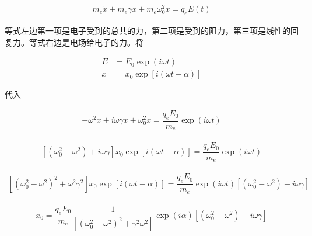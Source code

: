 \documentclass{article}
\begin{document}
\begin{equation*}
  \begin{aligned}
    m_e \ddot{x} + m_e \gamma \dot{x} + m_e \omega_0^2 x = q_e E \left( t \right)
  \end{aligned}
\end{equation*}

等式左边第一项是电子受到的总共的力，第二项是受到的阻力，第三项是线性的回复力。等式右边是电场给电子的力。将

\begin{equation*}
  \begin{aligned}
    E &= E_0 \exp \left( i \omega t \right) \\
    x &= x_0 \exp \left[ i \left( \omega t - \alpha \right) \right]
  \end{aligned}
\end{equation*}

代入

\begin{equation*}
  \begin{aligned}
    - \omega^2 x + i \omega \gamma x + \omega_0^2 x = \dfrac{q_e E_0}{m_e} \exp \left( i \omega t \right) 
  \end{aligned}
\end{equation*}

\begin{equation*}
  \begin{aligned}
    \left[ \left( \omega_0^2 - \omega^2 \right)  + i \omega \gamma \right] x_0 \exp \left[ i \left( \omega t - \alpha \right) \right] = \dfrac{q_e E_0}{m_e} \exp \left( i \omega t \right) 
  \end{aligned}
\end{equation*}

\begin{equation*}
  \begin{aligned}
    \left[ \left( \omega_0^2 - \omega^2 \right)^2  + \omega^2 \gamma^2 \right] x_0 \exp \left[ i \left( \omega t - \alpha \right) \right] = \dfrac{q_e E_0}{m_e} \exp \left( i \omega t \right) \left[ \left( \omega_0^2 - \omega^2 \right) - i \omega \gamma \right]
  \end{aligned}
\end{equation*}

\begin{equation*}
  \begin{aligned}
    x_0 = \dfrac{q_e E_0}{m_e} \dfrac{1}{\left[ \left( \omega_0^2 - \omega^2 \right)^2 + \gamma^2 \omega^2 \right]} \exp \left( i \alpha \right) \left[ \left( \omega_0^2 - \omega^2 \right) - i \omega \gamma \right]
  \end{aligned}
\end{equation*}
\end{document}
